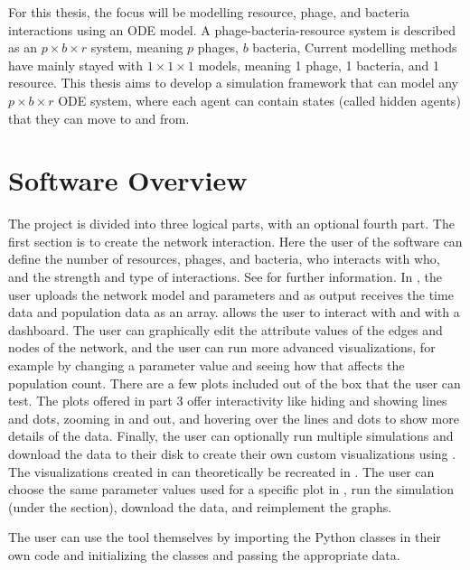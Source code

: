 For this thesis, the focus will be modelling resource, phage, and bacteria interactions using an ODE model. 
A phage-bacteria-resource system is described as an $p\times b \times r$ system, meaning $p$ phages, $b$ bacteria, 
Current modelling methods have mainly stayed with $1\times 1 \times 1$ models, meaning 1 phage, 1 bacteria, and 1 resource. 
This thesis aims to develop a simulation framework that can model any $p\times b \times r$ ODE system, where each agent can contain states (called hidden agents) that they can move to and from. 
\newline 

\section{Software Overview}
The project is divided into three logical parts, with an optional fourth part.
The first section is to create the network interaction. 
Here the user of the software can define the number of resources, phages, and bacteria, who interacts with who, and the strength and type of interactions. See  for further information. \newline
In , the user uploads the network model and parameters and as output receives the time data and population data as an array. \newline
{} allows the user to interact with  and  with a dashboard. 
The user can graphically edit the attribute values of the edges and nodes of the network, and the user can run more advanced visualizations, for example by changing a parameter value and seeing how that affects the population count. 
There are a few plots included out of the box that the user can test. 
The plots offered in part 3 offer interactivity like hiding and showing lines and dots, zooming in and out, and hovering over the lines and dots to show more details of the data. 
\newline
Finally, the user can optionally run multiple simulations and download the data to their disk to create their own custom visualizations using . 
The visualizations created in  can theoretically be recreated in . 
The user can choose the same parameter values used for a specific plot in , run the simulation (under the  section), download the data, and reimplement the graphs. 

The user can use the tool themselves by importing the Python classes in their own code and initializing the classes and passing the appropriate data. 